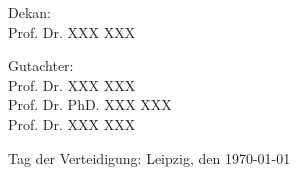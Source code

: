 \begin{titlepage}
\begin{center}
\end{center}
\clearpage
\thispagestyle{empty}
\begin{center}
\normalsize

  \hspace{0cm}
  \vfill

  Dekan:\\
  Prof. Dr. XXX XXX

  Gutachter:\\
  Prof. Dr. XXX XXX\\
  Prof. Dr. PhD. XXX XXX\\
  Prof. Dr. XXX XXX

  \vfill

  Tag der Verteidigung: Leipzig, den \today

  \vfill

\end{center}
\end{titlepage}
\thispagestyle{empty}
